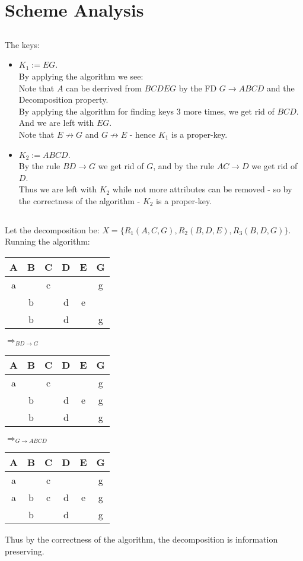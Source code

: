 \section{Scheme Analysis}
\subsection{}
The keys:
\begin{itemize}
	\item $K_1:= EG$.\\
	By applying the algorithm we see:\\
	Note that $A$ can be derrived from $BCDEG$ by the FD $G\rightarrow ABCD$
	and the Decomposition property.\\
	By applying the algorithm for finding keys 3 more times,
	we get rid of $BCD$. And we are left with $EG$.\\
	Note that $E\not\rightarrow G$ and $G\not\rightarrow E$ - 
	hence $K_1$ is a proper-key.

	\item $K_2:= ABCD$.\\
	By the rule $BD\rightarrow G$ we get rid of $G$,
	and by the rule $AC\rightarrow D$ we get rid of $D$.\\
	Thus we are left with $K_2$ while not more attributes can be removed -
	so by the correctness of the algorithm - $K_2$ is a proper-key.
\end{itemize}

\subsection{}
Let the decomposition be:
$X=\{R_1(A,C,G), R_2(B,D,E), R_3(B,D,G)\}$.\\
Running the algorithm:
\begin{center}
	\begin{tabular}{| c | c | c | c | c | c |}
		\hline
		A	&B	&C	&D	&E	&G	\\\hline
		a	&	&c	&	&	&g	\\\hline
			&b	&	&d	&e	&	\\\hline
			&b	&	&d	&	&g	\\\hline
	\end{tabular}
	$\Rightarrow_{BD\rightarrow G}$
	\begin{tabular}{| c | c | c | c | c | c |}
		\hline
		A	&B	&C	&D	&E	&G	\\\hline
		a	&	&c	&	&	&g	\\\hline
			&b	&	&d	&e	&g	\\\hline
			&b	&	&d	&	&g	\\\hline
	\end{tabular}
	$\Rightarrow_{G\rightarrow ABCD}$
	\begin{tabular}{| c | c | c | c | c | c |}
		\hline
		A	&B	&C	&D	&E	&G	\\\hline
		a	&	&c	&	&	&g	\\\hline
		a	&b	&c	&d	&e	&g	\\\hline
			&b	&	&d	&	&g	\\\hline
	\end{tabular}
\end{center}
Thus by the correctness of the algorithm, the decomposition
is information preserving.

